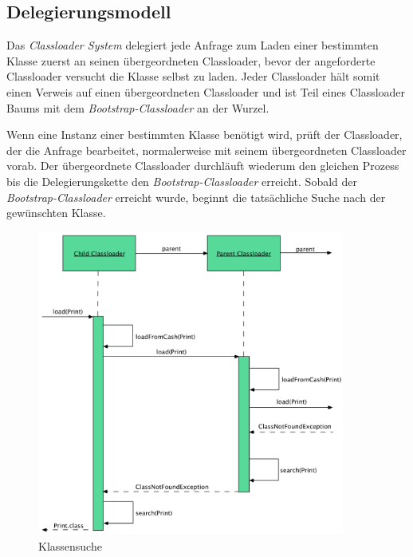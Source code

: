   \subsection{Delegierungsmodell} \label{sec:dm}
    
    Das \textit{Classloader System} delegiert jede Anfrage zum Laden einer bestimmten Klasse zuerst an seinen übergeordneten Classloader, bevor der angeforderte Classloader versucht die Klasse selbst zu laden. Jeder Classloader hält somit einen Verweis auf einen übergeordneten Classloader und ist Teil eines Classloader Baums mit dem \textit{Bootstrap-Classloader} an der Wurzel. 

    Wenn eine Instanz einer bestimmten Klasse benötigt wird, prüft der Classloader, der die Anfrage bearbeitet, normalerweise mit seinem übergeordneten Classloader vorab. Der übergeordnete Classloader durchläuft wiederum den gleichen Prozess bis die Delegierungskette den \textit{Bootstrap-Classloader} erreicht. Sobald der \textit{Bootstrap-Classloader} erreicht wurde, beginnt die tatsächliche Suche nach der gewünschten Klasse.

    \begin{figure}[h]
      \centering
      \includegraphics[width=0.9\textwidth]{material/images/deligation.png}
      \caption{Klassensuche}
      \label{fig:deligation}
    \end{figure}

